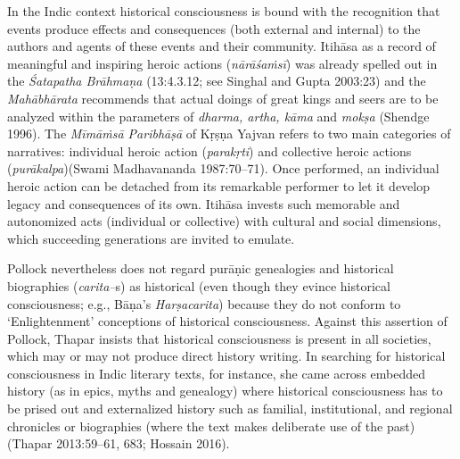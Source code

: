 In the Indic context historical consciousness is bound with the recognition that events produce effects and consequences (both external and internal) to the authors and agents of these events and their community. Itihāsa as a record of meaningful and inspiring heroic actions (\textit{nārāśaṁsī}) was already spelled out in the \textit{Śatapatha Brāhmaṇa} (13:4.3.12; see Singhal and Gupta 2003:23) and the \textit{Mahābhārata} recommends that actual doings of great kings and seers are to be analyzed within the parameters of \textit{dharma, artha, kāma} and \textit{mokṣa} (Shendge 1996). The \textit{Mīmāṁsā Paribhāṣā} of Kṛṣṇa Yajvan refers to two main categories of narratives: individual heroic action (\textit{parakṛti}) and collective heroic actions (\textit{purākalpa})(Swami Madhavananda 1987:70–71). Once performed, an individual heroic action can be detached from its remarkable performer to let it develop legacy and consequences of its own. Itihāsa invests such memorable and autonomized acts (individual or collective) with cultural and social dimensions, which succeeding generations are invited to emulate.

Pollock nevertheless does not regard purāṇic genealogies and historical biographies (\textit{carita–}s) as historical (even though they evince historical consciousness; e.g., Bāṇa’s \textit{Harṣacarita}) because they do not conform to ‘Enlightenment’ conceptions of historical consciousness. Against this assertion of Pollock, Thapar insists that historical consciousness is present in all societies, which may or may not produce direct history writing. In searching for historical consciousness in Indic literary texts, for instance, she came across embedded history (as in epics, myths and genealogy) where historical consciousness has to be prised out and externalized history such as familial, institutional, and regional chronicles or biographies (where the text makes deliberate use of the past)(Thapar 2013:59–61, 683; Hossain 2016).


